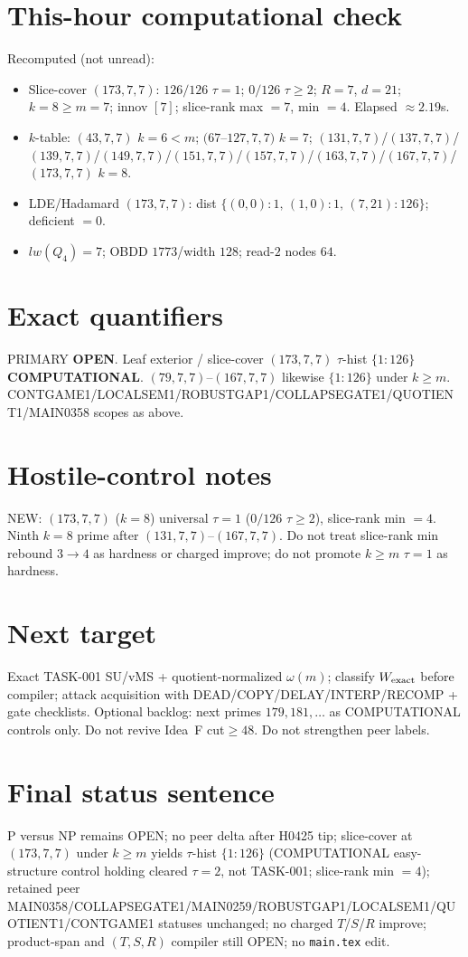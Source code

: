 \documentclass[11pt]{article}
\begin{document}
\section*{This-hour computational check}
Recomputed (not unread):
\begin{itemize}
\item Slice-cover $(173,7,7)$: $126/126$ $\tau{=}1$; $0/126$ $\tau{\ge}2$; $R{=}7$, $d{=}21$;
  $k{=}8{\ge}m{=}7$; innov $[7]$; slice-rank max $=7$, min $=4$. Elapsed $\approx2.19$s.
\item $k$-table: $(43,7,7)$ $k{=}6{<}m$; $(67$--$127,7,7)$ $k{=}7$;
  $(131,7,7)$/$(137,7,7)$/$(139,7,7)$/$(149,7,7)$/$(151,7,7)$/$(157,7,7)$/$(163,7,7)$/$(167,7,7)$/$(173,7,7)$ $k{=}8$.
\item LDE/Hadamard $(173,7,7)$: dist $\{(0,0){:}1,\,(1,0){:}1,\,(7,21){:}126\}$; deficient $=0$.
\item $lw(Q_4)=7$; OBDD $1773$/width $128$; read-$2$ nodes $64$.
\end{itemize}

\section*{Exact quantifiers}
PRIMARY \textbf{OPEN}. Leaf exterior / slice-cover $(173,7,7)$ $\tau$-hist $\{1{:}126\}$ \textbf{COMPUTATIONAL}.
$(79,7,7)$--$(167,7,7)$ likewise $\{1{:}126\}$ under $k{\ge}m$. CONTGAME1/LOCALSEM1/ROBUSTGAP1/COLLAPSEGATE1/QUOTIENT1/MAIN0358 scopes as above.

\section*{Hostile-control notes}
NEW: $(173,7,7)$ ($k{=}8$) universal $\tau{=}1$ ($0/126$ $\tau{\ge}2$), slice-rank min $=4$.
Ninth $k{=}8$ prime after $(131,7,7)$--$(167,7,7)$.
Do not treat slice-rank min rebound $3\to4$ as hardness or charged improve;
do not promote $k{\ge}m$ $\tau{=}1$ as hardness.

\section*{Next target}
Exact TASK-001 SU/vMS + quotient-normalized $\omega(m)$; classify $W_{\rm exact}$ before compiler;
attack acquisition with DEAD/COPY/DELAY/INTERP/RECOMP + gate checklists.
Optional backlog: next primes $179,181,\ldots$ as COMPUTATIONAL controls only.
Do not revive Idea~F cut$\ge48$. Do not strengthen peer labels.

\section*{Final status sentence}
P versus NP remains OPEN; no peer delta after H0425 tip; slice-cover at $(173,7,7)$ under $k{\ge}m$ yields $\tau$-hist $\{1{:}126\}$ (COMPUTATIONAL easy-structure control holding cleared $\tau{=}2$, not TASK-001; slice-rank min $=4$); retained peer MAIN0358/COLLAPSEGATE1/MAIN0259/ROBUSTGAP1/LOCALSEM1/QUOTIENT1/CONTGAME1 statuses unchanged; no charged $T$/$S$/$R$ improve; product-span and $(T,S,R)$ compiler still OPEN; no \texttt{main.tex} edit.
\end{document}
